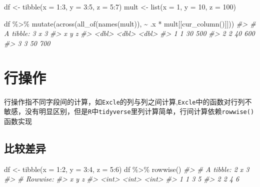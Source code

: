 \documentclass[
]{book}
\newenvironment{Shaded}{\begin{snugshade}}{\end{snugshade}}
\newcommand{\AttributeTok}[1]{\textcolor[rgb]{0.77,0.63,0.00}{#1}}
\newcommand{\CommentTok}[1]{\textcolor[rgb]{0.56,0.35,0.01}{\textit{#1}}}
\newcommand{\DecValTok}[1]{\textcolor[rgb]{0.00,0.00,0.81}{#1}}
\newcommand{\FunctionTok}[1]{\textcolor[rgb]{0.00,0.00,0.00}{#1}}
\newcommand{\NormalTok}[1]{#1}
\newcommand{\OtherTok}[1]{\textcolor[rgb]{0.56,0.35,0.01}{#1}}
\newcommand{\SpecialCharTok}[1]{\textcolor[rgb]{0.00,0.00,0.00}{#1}}
\begin{document}
\begin{Shaded}
\begin{Highlighting}[]
\NormalTok{df }\OtherTok{\textless{}{-}} \FunctionTok{tibble}\NormalTok{(}\AttributeTok{x =} \DecValTok{1}\SpecialCharTok{:}\DecValTok{3}\NormalTok{, }\AttributeTok{y =} \DecValTok{3}\SpecialCharTok{:}\DecValTok{5}\NormalTok{, }\AttributeTok{z =} \DecValTok{5}\SpecialCharTok{:}\DecValTok{7}\NormalTok{)}
\NormalTok{mult }\OtherTok{\textless{}{-}} \FunctionTok{list}\NormalTok{(}\AttributeTok{x =} \DecValTok{1}\NormalTok{, }\AttributeTok{y =} \DecValTok{10}\NormalTok{, }\AttributeTok{z =} \DecValTok{100}\NormalTok{)}

\NormalTok{df }\SpecialCharTok{\%\textgreater{}\%} \FunctionTok{mutate}\NormalTok{(}\FunctionTok{across}\NormalTok{(}\FunctionTok{all\_of}\NormalTok{(}\FunctionTok{names}\NormalTok{(mult)), }\SpecialCharTok{\textasciitilde{}}\NormalTok{ .x }\SpecialCharTok{*}\NormalTok{ mult[[}\FunctionTok{cur\_column}\NormalTok{()]]))}
\CommentTok{\#\textgreater{} \# A tibble: 3 x 3}
\CommentTok{\#\textgreater{}       x     y     z}
\CommentTok{\#\textgreater{}   \textless{}dbl\textgreater{} \textless{}dbl\textgreater{} \textless{}dbl\textgreater{}}
\CommentTok{\#\textgreater{} 1     1    30   500}
\CommentTok{\#\textgreater{} 2     2    40   600}
\CommentTok{\#\textgreater{} 3     3    50   700}
\end{Highlighting}
\end{Shaded}

\hypertarget{dplyr-row-manipulation}{%
\section{行操作}\label{dplyr-row-manipulation}}

行操作指不同字段间的计算，如\texttt{Excle}的列与列之间计算,\texttt{Excle}中的函数对行列不敏感，没有明显区别，但是\texttt{R}中\texttt{tidyverse}里列计算简单，行间计算依赖\texttt{rowwise()}函数实现

\hypertarget{ux6bd4ux8f83ux5deeux5f02}{%
\subsection{比较差异}\label{ux6bd4ux8f83ux5deeux5f02}}

\begin{Shaded}
\begin{Highlighting}[]
\NormalTok{df }\OtherTok{\textless{}{-}} \FunctionTok{tibble}\NormalTok{(}\AttributeTok{x =} \DecValTok{1}\SpecialCharTok{:}\DecValTok{2}\NormalTok{, }\AttributeTok{y =} \DecValTok{3}\SpecialCharTok{:}\DecValTok{4}\NormalTok{, }\AttributeTok{z =} \DecValTok{5}\SpecialCharTok{:}\DecValTok{6}\NormalTok{)}
\NormalTok{df }\SpecialCharTok{\%\textgreater{}\%} \FunctionTok{rowwise}\NormalTok{()}
\CommentTok{\#\textgreater{} \# A tibble: 2 x 3}
\CommentTok{\#\textgreater{} \# Rowwise: }
\CommentTok{\#\textgreater{}       x     y     z}
\CommentTok{\#\textgreater{}   \textless{}int\textgreater{} \textless{}int\textgreater{} \textless{}int\textgreater{}}
\CommentTok{\#\textgreater{} 1     1     3     5}
\CommentTok{\#\textgreater{} 2     2     4     6}
\end{Highlighting}
\end{Shaded}
\end{document}
